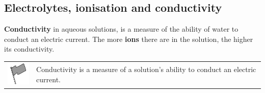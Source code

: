             \subsection{ Electrolytes, ionisation and conductivity}
            \nopagebreak
      \label{m38720*id338608}\textbf{Conductivity} in aqueous solutions, is a measure of the ability of water to conduct an electric current. The more \textbf{ions} there are in the solution, the higher its conductivity.\par 
\label{m38720*fhsst!!!underscore!!!id635}\begin{definition}
	  \begin{tabular*}{15 cm}{m{15 mm}m{}}
	\hspace*{-50pt}  \includegraphics[width=0.5in]{col11305.imgs/psflag2.png}   & \Definition{   \label{id2491504}\textbf{ Conductivity }} { \label{m38720*meaningfhsst!!!underscore!!!id635}
      Conductivity is a measure of a solution's ability to conduct an electric current.
       } 
      \end{tabular*}
      \end{definition}
      \label{m38720*uid52}
